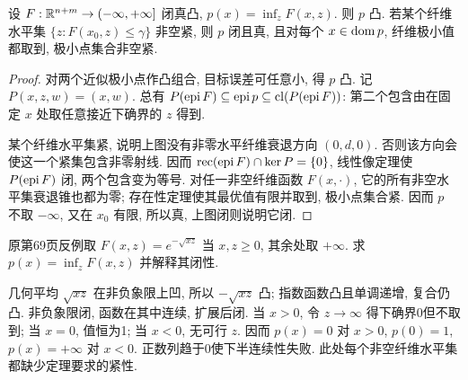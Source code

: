 \begin{theorem}\label{thm:partial-min}
设 $F:\mathbb R^{n+m}\to(-\infty,+\infty]$ 闭真凸, $p(x)=\inf_zF(x,z)$. 则 $p$ 凸. 若某个纤维水平集 $\{z:F(x_0,z)\le\gamma\}$ 非空紧, 则 $p$ 闭且真, 且对每个 $x\in\operatorname{dom} p$, 纤维极小值都取到, 极小点集合非空紧.
\end{theorem}
\begin{proof}
对两个近似极小点作凸组合, 目标误差可任意小, 得 $p$ 凸. 记 $P(x,z,w)=(x,w)$. 总有 $P(\operatorname{epi} F)\subseteq\operatorname{epi} p\subseteq\operatorname{cl}(P(\operatorname{epi} F))$: 第二个包含由在固定 $x$ 处取任意接近下确界的 $z$ 得到.

某个纤维水平集紧, 说明上图没有非零水平纤维衰退方向 $(0,d,0)$. 否则该方向会使这一个紧集包含非零射线. 因而 $\operatorname{rec}(\operatorname{epi} F)\cap\ker P=\{0\}$, 线性像定理使 $P(\operatorname{epi} F)$ 闭, 两个包含变为等号. 对任一非空纤维函数 $F(x,\cdot)$, 它的所有非空水平集衰退锥也都为零; 存在性定理使其最优值有限并取到, 极小点集合紧. 因而 $p$ 不取 $-\infty$, 又在 $x_0$ 有限, 所以真, 上图闭则说明它闭.
\end{proof}
\begin{example}
原第69页反例取 $F(x,z)=e^{-\sqrt{xz}}$ 当 $x,z\ge0$, 其余处取 $+\infty$. 求 $p(x)=\inf_zF(x,z)$ 并解释其闭性.
\end{example}
\begin{solution}
几何平均 $\sqrt{xz}$ 在非负象限上凹, 所以 $-\sqrt{xz}$ 凸; 指数函数凸且单调递增, 复合仍凸. 非负象限闭, 函数在其中连续, 扩展后闭. 当 $x>0$, 令 $z\to\infty$ 得下确界0但不取到; 当 $x=0$, 值恒为1; 当 $x<0$, 无可行 $z$. 因而 $p(x)=0$ 对 $x>0$, $p(0)=1$, $p(x)=+\infty$ 对 $x<0$. 正数列趋于0使下半连续性失败. 此处每个非空纤维水平集都缺少定理要求的紧性.
\end{solution}

